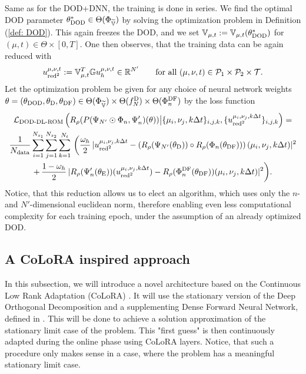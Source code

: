 Same as for the DOD+DNN, the training is done in series. We find the optimal DOD parameter 
$\theta^*_\text{DOD} \in \Theta(\Phi_{\widetilde{\mathbb{V}}})$ by solving the optimization problem in
Definition (\ref{def: DOD}). This again freezes the DOD, and we set $\mathbb{V}_{\mu, t}:= \mathbb{V}_{\mu, t}(\theta_\text{DOD}^*)$ for 
$(\mu, t) \in \Theta \times [0, T]$.
One then observes, that the training data can be again
reduced with
\begin{equation*}
    u_{\text{red}^2}^{\mu, \nu, t} := \mathbb{V}_{\mu, t}^T \mathbb{G} u_h^{\mu, \nu, t} \in \mathbb{R}^{N'} \qquad 
    \text{for all } (\mu, \nu, t) \in \mathcal{P}_1 \times \mathcal{P}_2 \times \mathcal{T}.
\end{equation*}
Let the optimization problem be given for any choice of neural network weights $\theta = 
(\theta_\text{DOD}, \theta_\text{D}, \theta_\text{DF}) \in 
\Theta(\Phi_{\widetilde{\mathbb{V}}}) \times \Theta(f_N^\text{D}) \times \Theta(\Phi_n^\text{DF})$
by the loss function
\begin{multline} \label{eq: loss function dod dl rom}
    \mathcal{L}_\text{DOD-DL-ROM}\left(R_\rho(P(\Psi_{N'} \odot \Phi_n, \Psi'_n)(\theta)) \big\vert \{\mu_i, \nu_j, k \Delta t\}_{i,j,k}, 
    \{u_{\text{red}^2}^{\mu_i, \nu_j, k \Delta t} \}_{i,j,k}\right) =  \\
        \frac{1}{N_\text{data}} \sum_{i=1}^{N_{s_1}} \sum_{j=1}^{N_{s_2}} 
        \sum_{k = 1}^{N_t} \, \bigg( \frac{\omega_h}{2} \, 
        \lvert u_{\text{red}^2}^{\mu_i, \nu_j, k \Delta t} - 
        \left(R_\rho(\Psi_{N'}(\theta_\text{D})) \circ R_\rho(\Phi_n(\theta_\text{DF}))\right) (\mu_i, \nu_j, k \Delta t) \rvert^2 \\
        + \, \frac{1 - \omega_h}{2} \, \lvert R_\rho(\Psi'_n(\theta_\text{E}))(u_{\text{red}^2}^{\mu_i, \nu_j, k \Delta t}) 
        - R_\rho(\Phi_n^\text{DF}(\theta_\text{DF}))(\mu_i, \nu_j, k \Delta t) \rvert^2 \bigg).
\end{multline}
Notice, that this reduction allows us to elect an algorithm, which uses only the $n$- and $N'$-dimensional euclidean norm,
therefore enabling even less computational complexity for each training epoch, under the assumption of an already 
optimized DOD.



\subsection{A CoLoRA inspired approach}




In this subsection, we will introduce a novel 
architecture based on the Continuous Low Rank Adaptation (CoLoRA) \cite{berman2024}.
It will use the stationary version of the Deep Orthogonal Decomposition and a supplementing
Dense Forward Neural Network, defined in \cite{franco2024}. This will be done to achieve a solution approximation of the 
stationary limit case of the problem. This "first guess" is then continuously adapted during the online phase using CoLoRA layers.
Notice, that such a procedure only makes sense in a case, where the problem has a meaningful stationary limit case.

